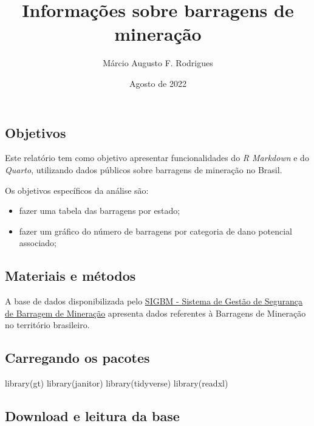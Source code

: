 \documentclass[
]{article}
\title{Informações sobre barragens de mineração}
\author{Márcio Augusto F. Rodrigues}
\date{Agosto de 2022}
\newenvironment{Shaded}{\begin{snugshade}}{\end{snugshade}}
\newcommand{\FunctionTok}[1]{\textcolor[rgb]{0.00,0.00,0.00}{#1}}
\newcommand{\NormalTok}[1]{#1}
\providecommand{\tightlist}{%
  \setlength{\itemsep}{0pt}\setlength{\parskip}{0pt}}
\begin{document}
\maketitle

\hypertarget{objetivos}{%
\subsection{Objetivos}\label{objetivos}}

Este relatório tem como objetivo apresentar funcionalidades do \emph{R
Markdown} e do \emph{Quarto}, utilizando dados públicos sobre barragens
de mineração no Brasil.

Os objetivos específicos da análise são:

\begin{itemize}
\tightlist
\item
  fazer uma tabela das barragens por estado;
\item
  fazer um gráfico do número de barragens por categoria de dano
  potencial associado;
\end{itemize}

\hypertarget{materiais-e-muxe9todos}{%
\subsection{Materiais e métodos}\label{materiais-e-muxe9todos}}

A base de dados disponibilizada pelo
\href{https://app.anm.gov.br/SIGBM/Publico/ClassificacaoNacionalDaBarragem}{SIGBM
- Sistema de Gestão de Segurança de Barragem de Mineração} apresenta
dados referentes à Barragens de Mineração no território brasileiro.

\hypertarget{carregando-os-pacotes}{%
\subsection{Carregando os pacotes}\label{carregando-os-pacotes}}

\begin{Shaded}
\begin{Highlighting}[]
\FunctionTok{library}\NormalTok{(gt)}
\FunctionTok{library}\NormalTok{(janitor)}
\FunctionTok{library}\NormalTok{(tidyverse)}
\FunctionTok{library}\NormalTok{(readxl)}
\end{Highlighting}
\end{Shaded}

\hypertarget{download-e-leitura-da-base}{%
\subsection{Download e leitura da
base}\label{download-e-leitura-da-base}}
\end{document}
